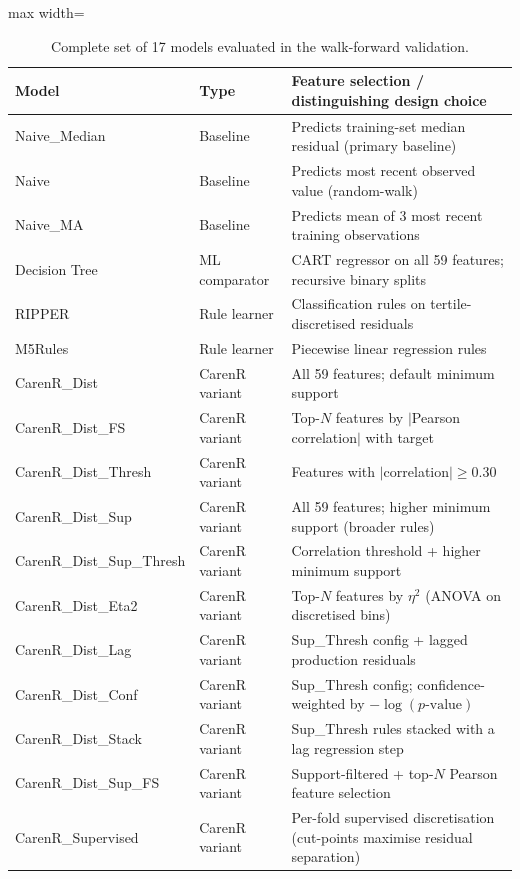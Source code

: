 \begin{table}[htbp]
  \centering
  \caption{Complete set of 17 models evaluated in the walk-forward validation.}\label{tab:ch3a_4}
  \small
  \begin{adjustbox}{max width=\textwidth}
    \begin{tabularx}{\textwidth}{>{\ttfamily}p{5cm} p{2.8cm} X}
    \toprule
    \normalfont\textbf{Model} & \textbf{Type} & \textbf{Feature selection / distinguishing design choice} \\
    \midrule
    Naive\_Median        & Baseline       & Predicts training-set median residual (primary baseline) \\[3pt]
    Naive                & Baseline       & Predicts most recent observed value (random-walk) \\[3pt]
    Naive\_MA            & Baseline       & Predicts mean of 3 most recent training observations \\[3pt]
    Decision Tree        & ML comparator  & CART regressor on all 59 features; recursive binary splits \\[3pt]
    RIPPER               & Rule learner   & Classification rules on tertile-discretised residuals \\[3pt]
    M5Rules              & Rule learner   & Piecewise linear regression rules \\[3pt]
    CarenR\_Dist         & CarenR variant & All 59 features; default minimum support \\[3pt]
    CarenR\_Dist\_FS     & CarenR variant & Top-$N$ features by $|$Pearson correlation$|$ with target \\[3pt]
    CarenR\_Dist\_Thresh & CarenR variant & Features with $|$correlation$| \geq 0.30$ \\[3pt]
    CarenR\_Dist\_Sup    & CarenR variant & All 59 features; higher minimum support (broader rules) \\[3pt]
    CarenR\_Dist\_Sup\_Thresh & CarenR variant & Correlation threshold + higher minimum support \\[3pt]
    CarenR\_Dist\_Eta2   & CarenR variant & Top-$N$ features by $\eta^2$ (ANOVA on discretised bins) \\[3pt]
    CarenR\_Dist\_Lag    & CarenR variant & Sup\_Thresh config + lagged production residuals \\[3pt]
    CarenR\_Dist\_Conf   & CarenR variant & Sup\_Thresh config; confidence-weighted by $-\log(p\text{-value})$ \\[3pt]
    CarenR\_Dist\_Stack  & CarenR variant & Sup\_Thresh rules stacked with a lag regression step \\[3pt]
    CarenR\_Dist\_Sup\_FS & CarenR variant & Support-filtered + top-$N$ Pearson feature selection \\[3pt]
    CarenR\_Supervised   & CarenR variant & Per-fold supervised discretisation (cut-points maximise residual separation) \\
    \bottomrule
  \end{tabularx}
  \end{adjustbox}

\end{table}


